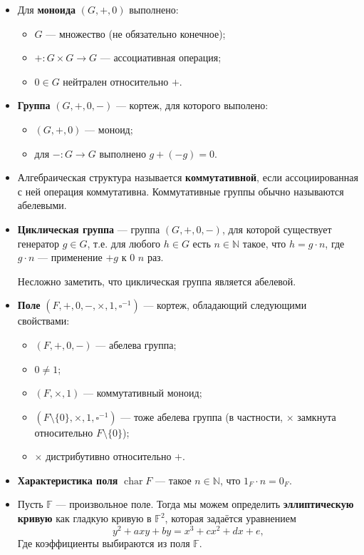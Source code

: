 \documentclass[a4paper,14pt]{extarticle}
\DeclareMathOperator{\chr}{char}
\begin{document}
\begin{itemize}
    \item Для \textbf{моноида} $(G, +, 0)$ выполнено:
        \begin{itemize}
            \item $G$ --- множество (не обязательно конечное);
            \item $+: G \times G \to G$ --- ассоциативная операция;
            \item $0 \in G$ нейтрален относительно $+$.
        \end{itemize}
    \item \textbf{Группа} $(G, +, 0, -)$ --- кортеж, для которого
        выполено:
        \begin{itemize}
            \item $(G, +, 0)$ --- моноид;
            \item для $-: G \to G$ выполнено $g + (-g) = 0$.
        \end{itemize}
    \item Алгебраическая структура называется \textbf{коммутативной}, если
        ассоциированная с ней операция коммутативна. Коммутативные группы обычно
        называются абелевыми.
    \item \textbf{Циклическая группа} --- группа $(G, +, 0, -)$, для которой
        существует генератор $g \in G$, т.е. для любого $h \in G$ есть
        $n \in \mathbb{N}$ такое, что $h = g \cdot n$, где $g \cdot n$ ---
        применение $+ g$ к $0$ $n$ раз.

        Несложно заметить, что циклическая группа является абелевой.
    \item \textbf{Поле} $(F, +, 0, -, \times, 1, \square^{-1})$ --- кортеж,
        обладающий следующими свойствами:
        \begin{itemize}
            \item $(F, +, 0, -)$ --- абелева группа;
            \item $0 \ne 1$;
            \item $(F, \times, 1)$ --- коммутативный моноид;
            \item $(F \setminus \{0\}, \times, 1, \square^{-1})$ --- тоже
                абелева группа (в частности, $\times$ замкнута относительно
                $F \setminus \{0\}$);
            \item $\times$ дистрибутивно относительно $+$.
        \end{itemize}
    \item \textbf{Характеристика поля} $\chr F$ --- такое $n \in \mathbb{N}$,
        что $1_F \cdot n = 0_F$.
    \item Пусть $\mathbb{F}$ --- произвольное поле. Тогда мы можем определить
        \textbf{эллиптическую кривую} как гладкую кривую в $\mathbb{F}^2$,
        которая задаётся уравнением
        \[
            y^2 + a x y + b y = x^3 + c x^2 + d x + e,
        \]
        Где коэффициенты выбираются из поля $\mathbb{F}$.


\end{itemize}
\end{document}
